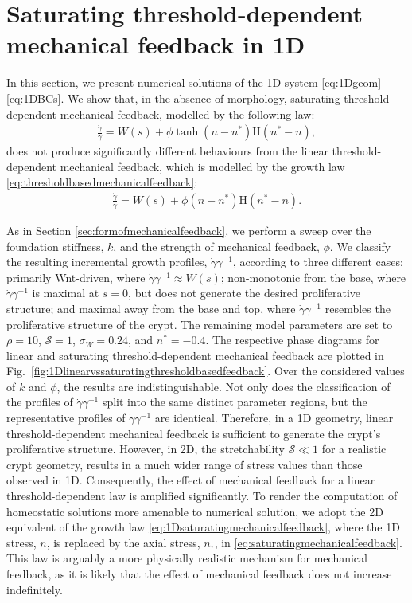 \section{Saturating threshold-dependent mechanical feedback in 1D}
\label{app:saturatingvslinearthreshold1D}
In this section, we present numerical solutions of the 1D system \eqref{eq:1Dgeom}--\eqref{eq:1DBCs}. We show that, in the absence of morphology, saturating threshold-dependent mechanical feedback, modelled by the following law:
\begin{align}
\frac{\dot{\gamma}}{\gamma} = W(s) + \phi\tanh(n - n^*)\mathrm{H}(n^* - n),\label{eq:1Dsaturatingmechanicalfeedback}
\end{align}
does not produce significantly different behaviours from the linear threshold-dependent mechanical feedback, which is modelled by the growth law \eqref{eq:thresholdbasedmechanicalfeedback}:
\begin{align*}
\frac{\dot{\gamma}}{\gamma} = W(s) + \phi(n - n^*)\mathrm{H}(n^* - n).
\end{align*}

As in Section \ref{sec:formofmechanicalfeedback}, we perform a sweep over the foundation stiffness, $k$, and the strength of mechanical feedback, $\phi$. We classify the resulting incremental growth profiles, $\dot{\gamma}\gamma^{-1}$, according to three different cases: primarily Wnt-driven, where $\dot{\gamma}\gamma^{-1} \approx W(s)$; non-monotonic from the base, where $\dot{\gamma}\gamma^{-1}$ is maximal at $s = 0$, but does not generate the desired proliferative structure; and maximal away from the base and top, where $\dot{\gamma}\gamma^{-1}$ resembles the proliferative structure of the crypt.  The remaining model parameters are set to $\rho = 10$, $\mathcal{S} = 1$, $\sigma_W = 0.24$, and $n^* = -0.4$. The respective phase diagrams for linear and saturating threshold-dependent mechanical feedback are plotted in Fig.\ \ref{fig:1Dlinearvssaturatingthresholdbasedfeedback}. Over the considered values of $k$ and $\phi$, the results are indistinguishable. Not only does the classification of the profiles of $\dot{\gamma}\gamma^{-1}$ split into the same distinct parameter regions, but the representative profiles of $\dot{\gamma}\gamma^{-1}$ are identical. Therefore, in a 1D geometry, linear threshold-dependent mechanical feedback is sufficient to generate the crypt's proliferative structure. However, in 2D, the stretchability $\mathcal{S} \ll 1$ for a realistic crypt geometry, results in a much wider range of stress values than those observed in 1D. Consequently, the effect of mechanical feedback for a linear threshold-dependent law is amplified significantly. To render the computation of homeostatic solutions more amenable to numerical solution, we adopt the 2D equivalent of the growth law \eqref{eq:1Dsaturatingmechanicalfeedback}, where the 1D stress, $n$, is replaced by the axial stress, $n_\tau$, in \eqref{eq:saturatingmechanicalfeedback}. This law is arguably a more physically realistic mechanism for mechanical feedback, as it is likely that the effect of mechanical feedback does not increase indefinitely.

